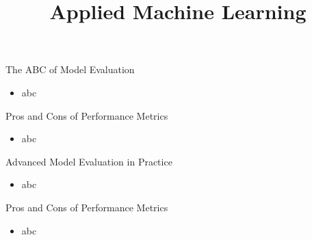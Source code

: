 \documentclass[11pt,compress,t,notes=noshow, aspectratio=169, xcolor=table]{beamer}
\title{Applied Machine Learning}
\date{}
\begin{document}
\newcommand{\titlefigure}{figure/performance_vs_interpretability}
\newcommand{\learninggoals}{
\item What to watch out for to evaluate models in practice
\item Pros and cons of performance metrics
\item Advanced evaluation practices}


\begin{frame}{The ABC of Model Evaluation}

\begin{itemize}
    \item abc
\end{itemize}
\end{frame}

\begin{frame}{Pros and Cons of Performance Metrics}

\begin{itemize}
    \item abc
\end{itemize}
\end{frame}

\begin{frame}{Advanced Model Evaluation in Practice}

\begin{itemize}
    \item abc
\end{itemize}
\end{frame}

\begin{frame}{Pros and Cons of Performance Metrics}

\begin{itemize}
    \item abc
\end{itemize}
\end{frame}
	


\endlecture
\end{document}
